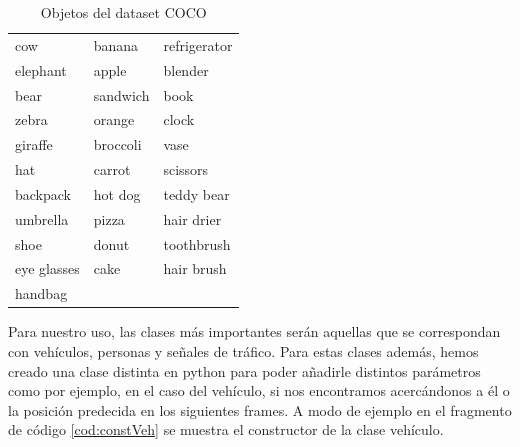 \begin{table}[h!]
\begin{tabular}{@{}lll@{}}
    cow           & banana         & refrigerator \\
    elephant      & apple          & blender      \\
    bear          & sandwich       & book         \\
    zebra         & orange         & clock        \\
    giraffe       & broccoli       & vase         \\
    hat           & carrot         & scissors     \\
    backpack      & hot dog        & teddy bear   \\
    umbrella      & pizza          & hair drier   \\
    shoe          & donut          & toothbrush   \\
    eye glasses   & cake           & hair brush   \\
    handbag       &                &              \\ \bottomrule
    \end{tabular}
    \caption{Objetos del dataset COCO}
    \label{tab:CocoObj}
\end{table}

Para nuestro uso, las clases más importantes serán aquellas que se correspondan con vehículos, personas y señales de tráfico. Para estas clases además, hemos creado una clase distinta en python para poder añadirle distintos parámetros como por ejemplo, en el caso del vehículo, si nos encontramos acercándonos a él o la posición predecida en los siguientes frames. A modo de ejemplo en el fragmento de código \ref{cod:constVeh} se muestra el constructor de la clase vehículo.
    
